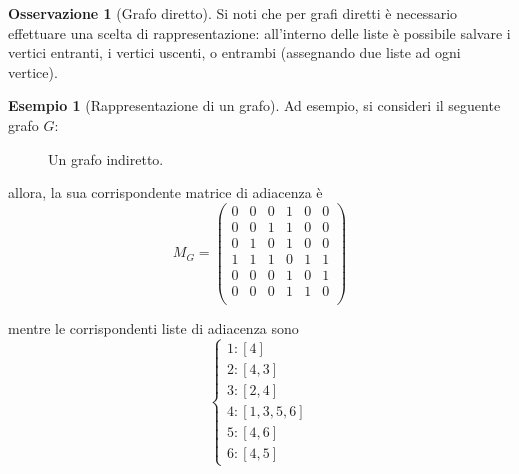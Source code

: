 \documentclass[14pt]{extreport}
\theoremstyle{definition}
\theoremstyle{definition}
\newtheorem{remark}{Osservazione}[subsection]
\newtheorem{example}{Esempio}[subsection]
\begin{document}
\begin{remark}[Grafo diretto]
    Si noti che per grafi diretti è necessario effettuare una scelta di rappresentazione: all'interno delle liste è possibile salvare i vertici entranti, i vertici uscenti, o entrambi (assegnando due liste ad ogni vertice).
\end{remark}

\begin{example}[Rappresentazione di un grafo]
    Ad esempio, si consideri il seguente grafo $G$:

    \begin{figure}[H]
        \centering
        \caption{Un grafo indiretto.}
    \end{figure}

    allora, la sua corrispondente matrice di adiacenza è
    $$M_G = \left( \begin{array}{llllll}
        0 & 0 & 0 & 1 & 0 & 0 \\
        0 & 0 & 1 & 1 & 0 & 0 \\
        0 & 1 & 0 & 1 & 0 & 0 \\
        1 & 1 & 1 & 0 & 1 & 1 \\
        0 & 0 & 0 & 1 & 0 & 1 \\
        0 & 0 & 0 & 1 & 1 & 0 \\
    \end{array} \right)$$

    mentre le corrispondenti liste di adiacenza sono $$\left \{ \begin{array}{l} 1: [4] \\ 2: [4, 3] \\ 3: [2, 4] \\ 4: [1, 3, 5, 6] \\ 5: [4, 6] \\ 6: [4, 5] \end{array} \right.$$
\end{example}
\end{document}
